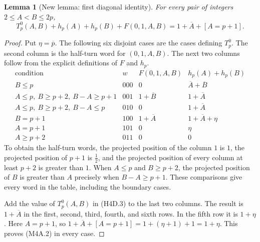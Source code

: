 \documentclass[11pt,oneside]{report}
\newtheorem{lemma}[theorem]{Lemma}
\theoremstyle{definition}
\numberwithin{equation}{section}
\begin{document}
\begin{lemma}[New lemma: first diagonal identity]
\label{J21:lem:h4-diagonal-primitive-first}
For every pair of integers $2\leq A<B\leq2p$,
\[
 T_p^0(A,B)+h_p(A)+h_p(B)+F(0,1,A,B)
       =1+\overline A+[A=p+1].
 \tag{M4A.2}
\]
\end{lemma}
\begin{proof}
Put $\eta=\overline p$.
The following six disjoint cases are the cases defining $T_p^0$.
The second column is the half-turn word for $(0,1,A,B)$.
The next two columns follow from the explicit definitions of $F$
and $h_p$.
\[
\begin{array}{c|c|c|c}
 \text{condition}&w&F(0,1,A,B)&h_p(A)+h_p(B)\\ \hline
 B\leq p&000&0&\overline A+\overline B\\
 A\leq p,\ B\geq p+2,\ B-A\geq p+1
       &001&1+\overline B&1+\overline A\\
 A\leq p,\ B\geq p+2,\ B-A\leq p
       &010&0&1+\overline A\\
 B=p+1&100&1+\overline A&1+\overline A+\eta\\
 A=p+1&101&0&\eta\\
 A\geq p+2&011&0&0
\end{array}
 \tag{M4A.3}
\]
To obtain the half-turn words, the projected position of the column
$1$ is $1$, the projected position of $p+1$ is $\tfrac12$, and the
projected position of every column at least $p+2$ is greater than
$1$.
When $A\leq p$ and $B\geq p+2$, the projected position of $B$ is
greater than $A$ precisely when $B-A\geq p+1$.
These comparisons give every word in the table, including the
boundary cases.

Add the value of $T_p^0(A,B)$ in (H4D.3) to the last two columns.
The result is $1+\overline A$ in the first, second, third, fourth,
and sixth rows.
In the fifth row it is $1+\eta$.
Here $A=p+1$, so
$1+\overline A+[A=p+1]=1+(\eta+1)+1=1+\eta$.
This proves (M4A.2) in every case.
\end{proof}
\end{document}
